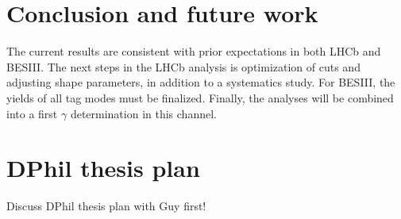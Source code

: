 \documentclass[12pt, a4paper, notitlepage, onecolumn]{article}
\begin{document}
\section{Conclusion and future work}
\noindent The current results are consistent with prior expectations in both LHCb and BESIII. The next steps in the LHCb analysis is optimization of cuts and adjusting shape parameters, in addition to a systematics study. For BESIII, the yields of all tag modes must be finalized. Finally, the analyses will be combined into a first $\gamma$ determination in this channel.




\newpage
\section{DPhil thesis plan}
\noindent Discuss DPhil thesis plan with Guy first!
\end{document}

